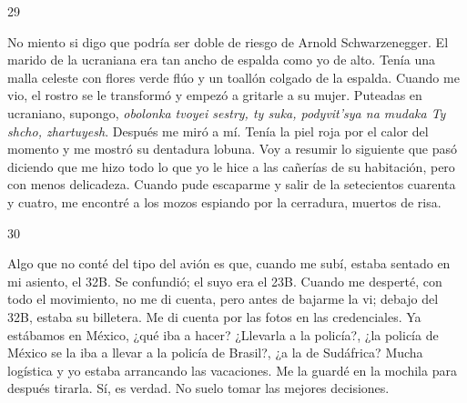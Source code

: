 \documentclass[12pt,twoside,openright,a5paper]{book}
\begin{document}
\hrulefill \hspace{0.1cm}\decofourleft\hspace{0.2cm} 29 \hspace{0.2cm}\decofourright \hspace{0.1cm}\hrulefill

\nopagebreak

\vspace{0.5cm}

\nopagebreak

No miento si digo que podría ser doble de riesgo de Arnold Schwarzenegger. El
marido de la ucraniana era tan ancho de espalda como yo de alto. Tenía
una malla celeste con flores verde flúo y un toallón colgado de la
espalda. Cuando me vio, el rostro se le transformó y empezó a gritarle a
su mujer. Puteadas en ucraniano, supongo, \emph{obolonka tvoyei sestry, ty suka,
podyvit'sya na mudaka Ty shcho, zhartuyesh}. Después me miró a mí. Tenía
la piel roja por el calor del momento y me mostró su dentadura lobuna. Voy
a resumir lo siguiente que pasó diciendo que me hizo todo lo que yo le
hice a las cañerías de su habitación, pero con menos delicadeza. Cuando
pude escaparme y salir de la setecientos cuarenta y cuatro, me encontré a
los mozos espiando por la cerradura, muertos de risa.

\vspace{0.5cm}

\hrulefill \hspace{0.1cm}\decofourleft\hspace{0.2cm} 30 \hspace{0.2cm}\decofourright \hspace{0.1cm}\hrulefill

\nopagebreak

\vspace{0.5cm}

\nopagebreak

Algo que no conté del tipo del avión es que, cuando me subí, estaba
sentado en mi asiento, el 32B. Se confundió; el suyo era el 23B. Cuando
me desperté, con todo el movimiento, no me di cuenta, pero antes de bajarme
la vi; debajo del 32B, estaba su billetera. Me di cuenta por las fotos en
las credenciales. Ya estábamos en México, ¿qué iba a hacer? ¿Llevarla
a la policía?, ¿la policía de México se la iba a llevar a la policía
de Brasil?, ¿a la de Sudáfrica? Mucha logística y yo estaba arrancando
las vacaciones. Me la guardé en la mochila para después tirarla. Sí,
es verdad. No suelo tomar las mejores decisiones.
\end{document}
